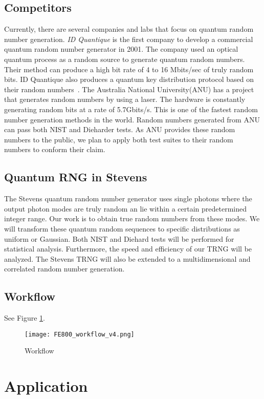 \documentclass{article}
\begin{document}
    \subsection{Competitors}
    Currently, there are several companies and labs that focus on quantum random number generation. \textit{ID Quantique} is the first company to develop a commercial quantum random number generator in 2001. The company used an optical quantum process as a random source to generate quantum random numbers. Their method can produce a high bit rate of 4 to 16 Mbits/sec of truly random bits. ID Quantique also produces a quantum key distribution protocol based on their random numbers~\citep{quantique2010random}.
    The Australia National University(ANU) has a project that generates random numbers by using a laser. The hardware is constantly generating random bits at a rate of 5.7Gbits/s. This is one of the fastest random number generation methods in the world. Random numbers generated from ANU can pass both NIST and Dieharder tests. As ANU provides these random numbers to the public, we plan to apply both test suites to their random numbers to conform their claim.


    \subsection{Quantum RNG in Stevens}
    The Stevens quantum random number generator uses single photons where the output photon modes are truly random an lie within a certain predetermined integer range. Our work is to obtain true random numbers from these modes. We will transform these quantum random sequences to specific distributions as uniform or Gaussian. Both NIST and Diehard tests will be performed for statistical analysis. Furthermore, the speed and efficiency of our TRNG will be analyzed. The Stevens TRNG will also be extended to a multidimensional and correlated random number generation.

    \subsection{Workflow}
    See Figure \ref{fig:Workflow}.
        \begin{figure}[!h]
        \centering
        \texttt{[image: FE800\_workflow\_v4.png]}
        \caption{Workflow}
        \label{fig:Workflow}
        \end{figure}


\section{Application}
\end{document}
